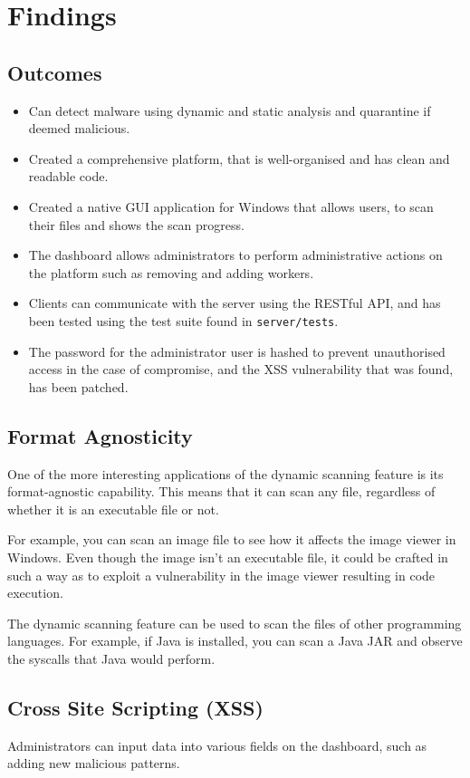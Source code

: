 \section{Findings}
\subsection{Outcomes}
\begin{itemize}
    \item Can detect malware using dynamic and static
    analysis and quarantine if deemed malicious.
    \item Created a comprehensive platform,
    that is well-organised and has clean and readable code.
    \item Created a native GUI application for Windows
    that allows users, to scan their files and shows the scan progress.
    \item The dashboard allows administrators to perform administrative
    actions on the platform such as removing and adding workers.
    \item Clients can communicate with the server using the
    RESTful API, and has been tested using the test suite found in \texttt{server/tests}.
    \item The password for the administrator user is hashed to prevent
    unauthorised access in the case of compromise,
    and the XSS vulnerability that was found, has been patched.
\end{itemize}

\subsection{Format Agnosticity}
One of the more interesting applications of the
dynamic scanning feature is its format-agnostic capability.
This means that it can scan any file,
regardless of whether it is an executable file or not.

For example, you can scan an image file to see how
it affects the image viewer in Windows.
Even though the image isn't an executable file,
it could be crafted in such a way as to exploit
a vulnerability in the image viewer resulting in code execution.

The dynamic scanning feature can be used to scan
the files of other programming languages.
For example, if Java is installed, you can scan a Java JAR
and observe the syscalls that Java would perform.

\subsection{Cross Site Scripting (XSS)}
Administrators can input data into various fields on the dashboard,
such as adding new malicious patterns.

